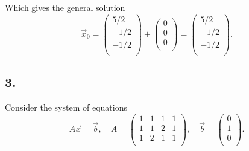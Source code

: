 Which gives the general solution
\[ 
\Vec{x}_0 = \begin{pmatrix}
5 / 2\\
-1 / 2\\
-1 / 2\\
\end{pmatrix} + \begin{pmatrix}
0\\
0\\
0\\
\end{pmatrix} = \begin{pmatrix}
5 / 2\\
- 1 / 2\\
- 1 / 2\\
\end{pmatrix}
.\]



\subsection*{3.}
Consider the system of equations
\[ 
A \Vec{x} = \Vec{b}, \quad A = \begin{pmatrix}
1 & 1 & 1 & 1\\
1 & 1 & 2 & 1\\
1 & 2 & 1 & 1\\
\end{pmatrix}, \quad \Vec{b} = \begin{pmatrix}
0\\
1\\
0\\
\end{pmatrix}
.\]


